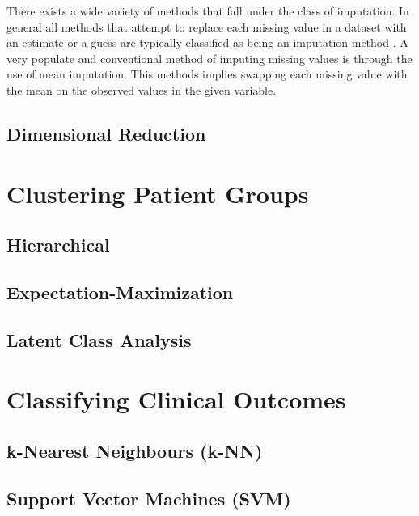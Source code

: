 \documentclass[../thesis.tex]{subfiles}
\begin{document}
\noindent There exists a wide variety of methods that fall under the class of imputation. In general all methods that attempt to replace each missing value in a dataset with an estimate or a guess are typically classified as being an imputation method \citep{allison1999missing}. A very populate and conventional method of imputing missing values is through the use of mean imputation. This methods implies swapping each missing value with the mean on the observed values in the given variable. 




\subsection{Dimensional Reduction}
\label{subsec:dim_red}

\section{Clustering Patient Groups}
\label{sec:cluster_pat_gro}

\subsection{Hierarchical}
\label{subsec:hierarchical}

\subsection{Expectation-Maximization}
\label{subsec:em}

\subsection{Latent Class Analysis}
\label{subsec:lca}

\section{Classifying Clinical Outcomes}
\label{sec:classify_clin_out}

\subsection{k-Nearest Neighbours (k-NN)}
\label{subsec:knn}

\subsection{Support Vector Machines (SVM)}
\label{subsec:svm}
\end{document}

